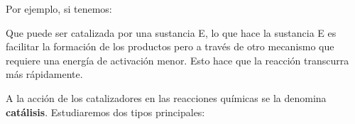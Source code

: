 \documentclass[
  spanish,
]{article}
\begin{document}
\hfill{}

Por ejemplo, si tenemos: 

Que puede ser catalizada por una sustancia E, lo que hace la sustancia E
es facilitar la formación de los productos pero a través de otro
mecanismo que requiere una energía de activación menor. Esto hace que la
reacción transcurra más rápidamente.

A la acción de los catalizadores en las reacciones químicas se la
denomina \textbf{catálisis}. Estudiaremos dos tipos principales:
\end{document}

